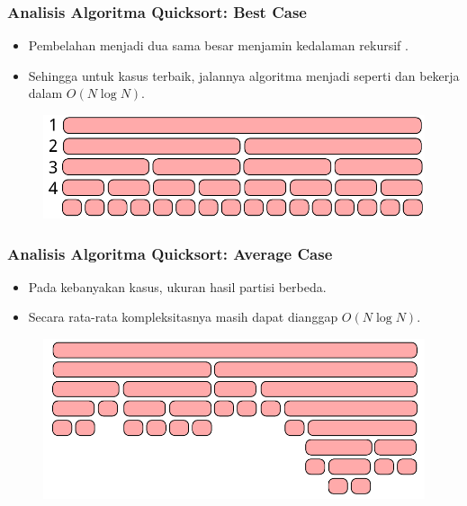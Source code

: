 \begin{frame}
\frametitle{Analisis Algoritma Quicksort: Best Case}
\begin{itemize}
  \item Pembelahan menjadi dua \fsubarray sama besar menjamin kedalaman rekursif .
  \item Sehingga untuk kasus terbaik, jalannya algoritma menjadi seperti \fMergeSort dan bekerja dalam $O(N \log{N})$.
\end{itemize}
\begin{figure}
  \centering
  \includegraphics[width=10 cm]{asset/merge-sort-complexity.pdf}
\end{figure}
\end{frame}
  
\begin{frame}
\frametitle{Analisis Algoritma Quicksort: Average Case}
\begin{itemize}
  \item Pada kebanyakan kasus, ukuran hasil partisi berbeda.
  \item Secara rata-rata kompleksitasnya masih dapat dianggap $O(N \log{N})$.
\end{itemize}
\begin{figure}
  \centering
  \includegraphics[width=10 cm]{asset/quicksort-complexity-average.pdf}
\end{figure}
\end{frame}

